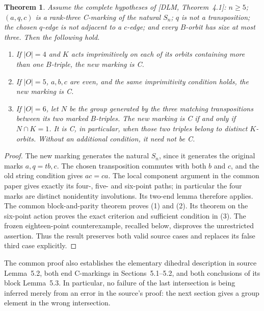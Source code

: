 \documentclass[a4paper,11pt]{article}
\newtheorem{theorem}{Theorem}
\begin{document}
\begin{theorem}
Assume the complete hypotheses of [DLM, Theorem~4.1]: $n\geq5$;
$(a,q,c)$ is a rank-three C-marking of the natural $S_n$; $q$ is not a
transposition; the chosen $q$-edge is not adjacent to a $c$-edge;
and every $B$-orbit has size at most three. Then the following hold.
\begin{enumerate}
\item If $|O|=4$ and $K$ acts imprimitively on each of its orbits
containing more than one $B$-triple, the new marking is C.
\item If $|O|=5$, $a,b,c$ are even, and the same imprimitivity
condition holds, the new marking is C.
\item If $|O|=6$, let $N$ be the group generated by the three matching
transpositions between its two marked $B$-triples. The new marking is C
if and only if $N\cap K=1$. It is C, in particular, when those two triples
belong to distinct $K$-orbits. Without an additional condition, it need
not be C.
\end{enumerate}
\end{theorem}
\begin{proof}
The new marking generates the natural $S_n$, since it generates the
original marks $a,q=tb,c$. The chosen transposition commutes with both
$b$ and $c$, and the old string condition gives $ac=ca$.
The local component argument in the common paper gives exactly its
four-, five- and six-point paths; in particular the four marks are distinct
nonidentity involutions. Its two-end lemma therefore applies.
The common block-and-parity theorem proves (1) and (2). Its theorem on the six-point action proves the exact criterion and sufficient condition in (3).
The frozen eighteen-point counterexample, recalled below, disproves the
unrestricted assertion. Thus the result preserves both valid source
cases and replaces its false third case explicitly.
\end{proof}

The common proof also establishes the elementary dihedral description
in source Lemma~5.2, both end C-markings in Sections~5.1--5.2, and both
conclusions of its block Lemma~5.3. In particular, no failure of the last
intersection is being inferred merely from an error in the source's
proof: the next section gives a group element in the wrong intersection.
\end{document}
